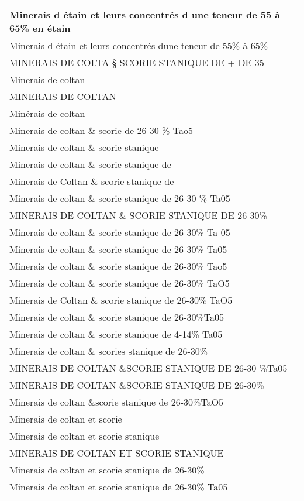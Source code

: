 \documentclass[
]{book}
\begin{document}
\begin{table}
\begin{tabular}[t]{l}
\hline
Minerais d étain et leurs concentrés d une teneur de 55 à 65\% en étain\\
\hline
Minerais d étain et leurs concentrés dune teneur de 55\% à 65\%\\
\hline
MINERAIS DE COLTA § SCORIE STANIQUE DE + DE 35\\
\hline
Minerais de coltan\\
\hline
MINERAIS DE COLTAN\\
\hline
Minérais de coltan\\
\hline
Minerais de coltan \& scorie de 26-30 \% Tao5\\
\hline
Minerais de coltan \& scorie stanique\\
\hline
Minerais de coltan \& scorie stanique de\\
\hline
Minerais de Coltan \& scorie stanique de\\
\hline
Minerais de coltan \& scorie stanique de 26-30 \% Ta05\\
\hline
MINERAIS DE COLTAN \& SCORIE STANIQUE DE 26-30\%\\
\hline
Minerais de coltan \& scorie stanique de 26-30\% Ta 05\\
\hline
Minerais de coltan \& scorie stanique de 26-30\% Ta05\\
\hline
Minerais de coltan \& scorie stanique de 26-30\% Tao5\\
\hline
Minerais de coltan \& scorie stanique de 26-30\% TaO5\\
\hline
Minerais de Coltan \& scorie stanique de 26-30\% TaO5\\
\hline
Minerais de coltan \& scorie stanique de 26-30\%Ta05\\
\hline
Minerais de coltan \& scorie stanique de 4-14\% Ta05\\
\hline
Minerais de coltan \& scories stanique de 26-30\%\\
\hline
MINERAIS DE COLTAN \&SCORIE STANIQUE DE 26-30 \%Ta05\\
\hline
MINERAIS DE COLTAN \&SCORIE STANIQUE DE 26-30\%\\
\hline
Minerais de coltan \&scorie stanique de 26-30\%TaO5\\
\hline
Minerais de coltan et scorie\\
\hline
Minerais de coltan et scorie stanique\\
\hline
MINERAIS DE COLTAN ET SCORIE STANIQUE\\
\hline
Minerais de coltan et scorie stanique de 26-30\%\\
\hline
Minerais de coltan et scorie stanique de 26-30\% Ta05\\

\end{tabular}
\end{table}
\end{document}
